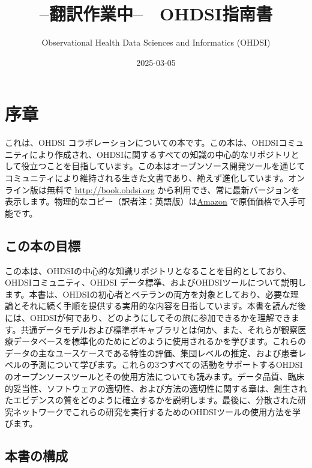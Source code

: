 \documentclass[
  11pt]{book}
\title{--翻訳作業中--　OHDSI指南書}
\author{Observational Health Data Sciences and Informatics (OHDSI)}
\date{2025-03-05}
\theoremstyle{definition}
\theoremstyle{definition}
\theoremstyle{definition}
\theoremstyle{definition}
\theoremstyle{remark}
\begin{document}
\maketitle

{
\setcounter{tocdepth}{1}
\tableofcontents
}
\chapter*{序章}\label{ux5e8fux7ae0}

これは、OHDSI コラボレーションについての本です。この本は、OHDSIコミュニティにより作成され、OHDSIに関するすべての知識の中心的なリポジトリとして役立つことを目指しています。この本はオープンソース開発ツールを通じてコミュニティにより維持される生きた文書であり、絶えず進化しています。オンライン版は無料で \url{http://book.ohdsi.org} から利用でき、常に最新バージョンを表示します。物理的なコピー（訳者注：英語版）は\href{https://www.amazon.com/OHDSI-Observational-Health-Sciences-Informatics/dp/1088855199}{Amazon} で原価価格で入手可能です。

\section*{この本の目標}\label{ux3053ux306eux672cux306eux76eeux6a19}

この本は、OHDSIの中心的な知識リポジトリとなることを目的としており、OHDSIコミュニティ、OHDSI データ標準、およびOHDSIツールについて説明します。本書は、OHDSIの初心者とベテランの両方を対象としており、必要な理論とそれに続く手順を提供する実用的な内容を目指しています。本書を読んだ後には、OHDSIが何であり、どのようにしてその旅に参加できるかを理解できます。共通データモデルおよび標準ボキャブラリとは何か、また、それらが観察医療データベースを標準化のためにどのように使用されるかを学びます。これらのデータの主なユースケースである特性の評価、集団レベルの推定、および患者レベルの予測について学びます。これらの3つすべての活動をサポートするOHDSIのオープンソースツールとその使用方法についても読みます。データ品質、臨床的妥当性、ソフトウェアの適切性、および方法の適切性に関する章は、創生されたエビデンスの質をどのように確立するかを説明します。最後に、分散された研究ネットワークでこれらの研究を実行するためのOHDSIツールの使用方法を学びます。

\section*{本書の構成}\label{ux672cux66f8ux306eux69cbux6210}
\end{document}
